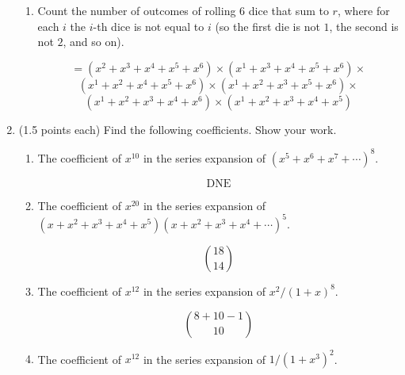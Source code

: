 \documentclass[11pt]{article}
\begin{document}
\begin{enumerate}
\begin{enumerate}
	\item Count the number of outcomes of rolling $6$ dice that sum to $r$,
	where for each $i$ the $i$-th dice is not equal to $i$ (so
	the first die is not $1$, the second is not $2$, and so on).
	
	\[ = (x^2 + x^3 + x^4 + x^5 + x^6) \times (x^1 + x^3 + x^4 + x^5 + x^6) \times \]
	\[   (x^1 + x^2 + x^4 + x^5 + x^6) \times (x^1 + x^2 + x^3 + x^5 + x^6) \times \]
	\[   (x^1 + x^2 + x^3 + x^4 + x^6) \times (x^1 + x^2 + x^3 + x^4 + x^5) \]
	
\end{enumerate}

\item (1.5 points each) Find the following coefficients.  Show your work.
	\begin{enumerate}
		\item The coefficient of $x^{10}$ in the series expansion of 
		$(x^5+x^6 + x^7+ \cdots)^8$.
		
		\[ \mathrm{DNE} \]
		
		\item The coefficient of $x^{20}$ in the series expansion of 
		$(x+x^2 + x^3+x^4+x^5) (x+x^2 + x^3+x^4+\cdots)^5 $.
		
		\[ 18 \choose 14 \]
		
		\item The coefficient of $x^{12}$ in the series expansion of
		$x^2/(1+x)^8$.
		
		\[ 8 + 10 - 1 \choose 10\]
		
		\item The coefficient of $x^{12}$ in the series expansion of
		$1/(1+x^3)^2$.
	\end{enumerate}

\end{enumerate}
\end{document}
